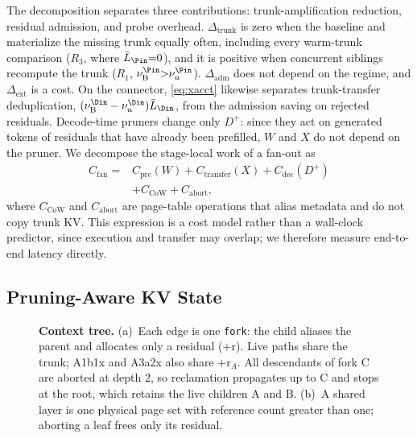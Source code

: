The decomposition separates three contributions: trunk-amplification reduction, residual admission, and probe overhead.
$\Delta_{\mathrm{trunk}}$ is zero when the baseline and \sys materialize the missing trunk equally often, including every warm-trunk comparison ($R_3$, where $\bar L_{\Pin}{=}0$), and it is positive when concurrent siblings recompute the trunk ($R_1$, $\nu_{\mathrm{B}}^{\Pin}{>}\nu_u^{\Pin}$).
$\Delta_{\mathrm{adm}}$ does not depend on the regime, and $\Delta_{\mathrm{ext}}$ is a cost.
On the connector, \eqref{eq:xacct} likewise separates trunk-transfer deduplication, $(\nu_{\mathrm{B}}^{\Din}-\nu_u^{\Din})\bar L_{\Din}$, from the admission saving on rejected residuals.
Decode-time pruners change only $D^{+}$: since they act on generated tokens of residuals that have already been prefilled, $W$ and $X$ do not depend on the pruner.
We decompose the stage-local work of a fan-out as
\begin{equation}
\label{eq:tfan}
\begin{aligned}
C_{\mathrm{fan}}={}&C_{\mathrm{pre}}(W)+C_{\mathrm{transfer}}(X)+C_{\mathrm{dec}}(D^{+})\\
&+C_{\mathrm{CoW}}+C_{\mathrm{abort}},
\end{aligned}
\end{equation}
where $C_{\mathrm{CoW}}$ and $C_{\mathrm{abort}}$ are page-table operations that alias metadata and do not copy trunk KV.
This expression is a cost model rather than a wall-clock predictor, since execution and transfer may overlap; we therefore measure end-to-end latency directly.

\subsection{Pruning-Aware KV State}
\label{sec:kvstate}

\begin{figure}[t]
\centering
\resizebox{\textwidth}{!}{}
\caption{\textbf{Context tree.}
(a)~Each edge is one \texttt{fork}: the child aliases the parent and allocates only a residual ($+$r).
Live paths share the trunk; A1b1x and A3a2x also share $+$r$_A$.
All descendants of fork C are aborted at depth 2, so reclamation propagates up to C and stops at the root, which retains the live children A and B.
(b)~A shared layer is one physical page set with reference count greater than one; aborting a leaf frees only its residual.}
\label{fig:tree}
\end{figure}

